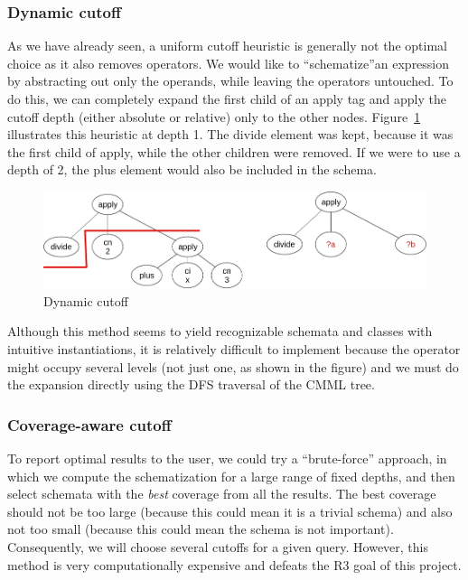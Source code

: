 \subsubsection{Dynamic cutoff}\label{subsubsec:dynamic_cutoff}
As we have already seen, a uniform cutoff heuristic is generally not the
optimal choice as it also removes operators. We would like to ``schematize''an
expression by abstracting out only the operands, while leaving the operators
untouched. To do this, we can completely expand the first child of an
\textsf{apply} tag and apply the cutoff depth (either absolute or relative)
only to the other nodes. Figure~\ref{fig:cutoff_dynamic} illustrates this
heuristic at depth 1. The \textsf{divide} element was kept, because it was the
first child of \textsf{apply}, while the other children were removed.
If we were to use a depth of 2, the \textsf{plus} element would also be
included in the schema.

\begin{figure}[ht]\centering
    \includegraphics[scale=0.3]{img/cutoff_dynamic.png}
    \caption{Dynamic cutoff}\label{fig:cutoff_dynamic}
\end{figure}
\FloatBarrier

Although this method seems to yield recognizable schemata and classes with
intuitive instantiations, it is relatively difficult to implement because the
operator might occupy several levels (not just one, as shown in the figure) and
we must do the expansion directly using the DFS traversal of the CMML tree.

\subsubsection{Coverage-aware cutoff}\label{subsubsec:coverage_aware_cutoff}
To report optimal results to the user, we could try a ``brute-force'' approach,
in which we compute the schematization for a large range of fixed depths, and
then select schemata with the \textit{best} coverage from all the results. The
best coverage should not be too large (because this could mean it is a trivial
schema) and also not too small (because this could mean the schema is not
important). Consequently, we will choose several cutoffs for a given query.
However, this method is very computationally expensive and defeats
the \textsf{R3} goal of this project.

